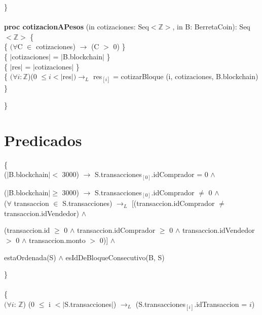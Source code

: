 \documentclass{article}
\newcommand{\Entero}{$\mathds{Z}$}
\begin{document}
    \}\\\\

    {\selectfont\textbf{proc cotizacionAPesos} (in cotizaciones: Seq$<$\Entero$>$, in B: BerretaCoin): Seq$<$\Entero$>$} \{\\
        \indent{} \{ $(\forall$C $\in$ cotizaciones) $\rightarrow$ (C $>$ 0) \}\\
        \indent{} \{ $|$cotizaciones$|$ = $|$B.blockchain$|$ \}\\
        \indent{} \{ $|$res$|$ = $|$cotizaciones$|$ \}\\
        \indent{} \{ $(\forall i: $\Entero)(0 $\le i < |$res$|)\rightarrow_{L}$ res$_{[i]}$ = cotizarBloque (i, cotizaciones, B.blockchain) \}

    \}\\
    \newpage
    \section*{Predicados}


     \{\\
        \indent\indent ($|$B.blockchain$|<$ 3000) $\rightarrow$ S.transacciones$_{[0]}$.idComprador = 0 $\land$

        \indent\indent ($|$B.blockchain$|\ge$ 3000) $\rightarrow$ S.transacciones$_{[0]}$.idComprador $\ne$ 0 $\land$\\
        \indent\indent($\forall$ transaccion $\in$ S.transacciones) $\rightarrow_{L}$ [(transaccion.idComprador $\ne$ transaccion.idVendedor) $\land$

        \indent\indent(transaccion.id $\ge$ 0 $\land$ transaccion.idComprador $\ge$ 0 $\land$ transaccion.idVendedor $>$ 0 $\land$ transaccion.monto $>$ 0)] $\land$

        \indent\indent estaOrdenada(S) $\land$ esIdDeBloqueConsecutivo(B, S)

    \indent\}\\\\



     \{\\
        \indent\indent $(\forall i$: \Entero) (0 $\le$ i $< |$S.transacciones$|$) $\rightarrow_{L}$ (S.transacciones$_{[i]}$.idTransaccion = $i$)
\end{document}

